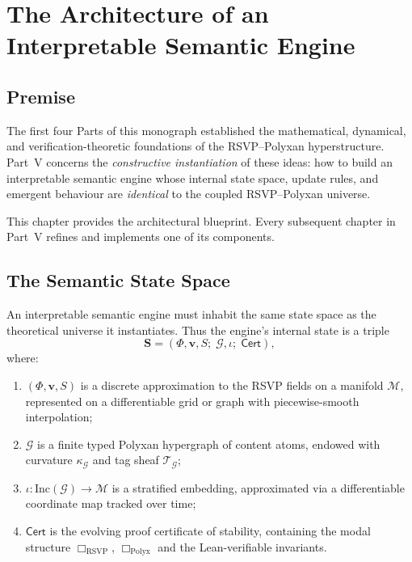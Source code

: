 \chapter{The Architecture of an Interpretable Semantic Engine}
\label{ch:71}

\section{Premise}

The first four Parts of this monograph established the mathematical,
dynamical, and verification-theoretic foundations of the
RSVP--Polyxan hyperstructure.
Part~V concerns the \emph{constructive instantiation} of these ideas:
how to build an interpretable semantic engine whose internal
state space, update rules, and emergent behaviour are 
\emph{identical} to the coupled RSVP--Polyxan universe.

This chapter provides the architectural blueprint.
Every subsequent chapter in Part~V refines and implements one of its components.

\section{The Semantic State Space}

An interpretable semantic engine must inhabit the same state space as
the theoretical universe it instantiates.
Thus the engine’s internal state is a triple
\[
  \mathbf{S} = (\Phi, \mathbf{v}, S;\; \mathcal{G}, \iota;\; \mathsf{Cert}),
\]
where:
\begin{enumerate}
\item $(\Phi,\mathbf{v},S)$ is a discrete approximation to the RSVP fields
      on a manifold $\mathcal{M}$, represented on a differentiable grid
      or graph with piecewise-smooth interpolation;
\item $\mathcal{G}$ is a finite typed Polyxan hypergraph of content atoms,
      endowed with curvature $\kappa_{\mathcal{G}}$ and tag sheaf $\mathscr{T}_{\mathcal{G}}$;
\item $\iota : \mathrm{Inc}(\mathcal{G}) \to \mathcal{M}$ is a stratified embedding,
      approximated via a differentiable coordinate map tracked over time;
\item $\mathsf{Cert}$ is the evolving proof certificate of stability,
      containing the modal structure
      $\Box_{\mathrm{RSVP}}$, $\Box_{\mathrm{Polyx}}$ and the Lean-verifiable invariants.
\end{enumerate}

